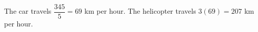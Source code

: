 The car travels $\dfrac{345}{5}=69$ km per hour. The helicopter travels $3(69)=\boxed{207}$ km per hour.
